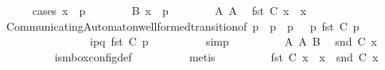 \begin{isabellebody}
\ \ \ \ \isamarkupfalse%
\ {\isacharparenleft}{\kern0pt}cases\ {\isachardoublequoteopen}x\ {\isacharequal}{\kern0pt}\ p{\isachardoublequoteclose}{\isacharparenright}{\kern0pt}\isanewline
\ \ \ \ \ \ \isamarkupfalse%
\ B{\isacharcolon}{\kern0pt}\ {\isachardoublequoteopen}x\ {\isacharequal}{\kern0pt}\ p{\isachardoublequoteclose}\isanewline
\ \ \ \ \ \ \isamarkupfalse%
\ A{}\ A{}\ \isamarkupfalse%
\ {\isachardoublequoteopen}fst\ {\isacharparenleft}{\kern0pt}C{}\ x{\isacharparenright}{\kern0pt}\ {\isasymin}\ {\isasymS}{\isacharparenleft}{\kern0pt}x{\isacharparenright}{\kern0pt}{\isachardoublequoteclose}\isanewline
\ \ \ \ \ \ \ \ \isamarkupfalse%
\ CommunicatingAutomaton{\isachardot}{\kern0pt}well{\isacharunderscore}{\kern0pt}formed{\isacharunderscore}{\kern0pt}transition{\isacharbrackleft}{\kern0pt}of\ p\ {\isachardoublequoteopen}{\isasymS}\ p{\isachardoublequoteclose}\ {\isachardoublequoteopen}{\isasymI}\ p{\isachardoublequoteclose}\ {\isasymM}\ {\isachardoublequoteopen}{\isasymR}\ p{\isachardoublequoteclose}\ {\isachardoublequoteopen}fst\ {\isacharparenleft}{\kern0pt}C{}\ p{\isacharparenright}{\kern0pt}{\isachardoublequoteclose}\isanewline
\ \ \ \ \ \ \ \ \ \ \ \ \ \ \ \ {\isachardoublequoteopen}{\isacharbang}{\kern0pt}{\isasymlangle}{\isacharparenleft}{\kern0pt}i\isactrlbsup p{\isasymrightarrow}q\isactrlesup {\isacharparenright}{\kern0pt}{\isasymrangle}{\isachardoublequoteclose}\ {\isachardoublequoteopen}fst\ {\isacharparenleft}{\kern0pt}C{}\ p{\isacharparenright}{\kern0pt}{\isachardoublequoteclose}{\isacharbrackright}{\kern0pt}\isanewline
\ \ \ \ \ \ \ \ \isamarkupfalse%
\ simp\isanewline
\ \ \ \ \ \ \isamarkupfalse%
\ \isamarkupfalse%
\ A{}\ A{}\ B\ \isamarkupfalse%
\ {\isachardoublequoteopen}snd\ {\isacharparenleft}{\kern0pt}C{}\ x{\isacharparenright}{\kern0pt}\ {\isasymin}\ {\isasymM}\isactrlsup {\isacharasterisk}{\kern0pt}{\isachardoublequoteclose}\isanewline
\ \ \ \ \ \ \ \ \isamarkupfalse%
\ is{\isacharunderscore}{\kern0pt}mbox{\isacharunderscore}{\kern0pt}config{\isacharunderscore}{\kern0pt}def\isanewline
\ \ \ \ \ \ \ \ \isamarkupfalse%
\ metis\isanewline
\ \ \ \ \ \ \isamarkupfalse%
\ \isamarkupfalse%
\ {\isachardoublequoteopen}fst\ {\isacharparenleft}{\kern0pt}C{}\ x{\isacharparenright}{\kern0pt}\ {\isasymin}\ {\isasymS}{\isacharparenleft}{\kern0pt}x{\isacharparenright}{\kern0pt}\ {\isasymand}\ snd\ {\isacharparenleft}{\kern0pt}C{}\ x{\isacharparenright}{\kern0pt}\ {\isasymin}\ {\isasymM}\isactrlsup {\isacharasterisk}{\kern0pt}{\isachardoublequoteclose}\isanewline

\end{isabellebody}
